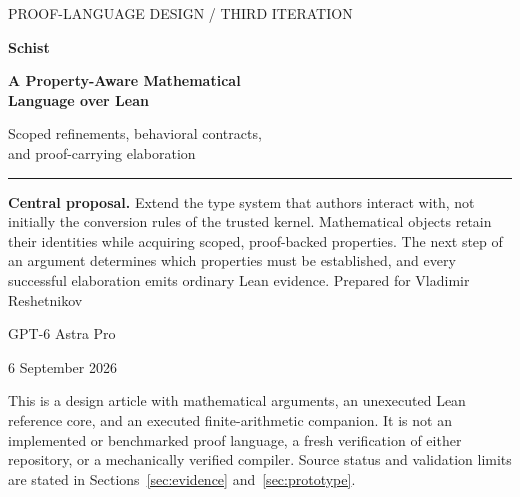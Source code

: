 \documentclass[11pt,a4paper]{article}
\theoremstyle{definition}
\begin{document}
\hypersetup{pageanchor=false}
\begin{titlepage}
{\sffamily\large\color{accent}PROOF-LANGUAGE DESIGN \quad / \quad THIRD ITERATION\par}
\vspace{24mm}
{\sffamily\bfseries\color{ink}\fontsize{38}{42}\selectfont Schist\par}
\vspace{5mm}
{\sffamily\bfseries\color{ink}\fontsize{25}{30}\selectfont A Property-Aware Mathematical\\Language over Lean\par}
\vspace{9mm}
{\sffamily\Large Scoped refinements, behavioral contracts,\\and proof-carrying elaboration\par}
\vspace{15mm}
\rule{\textwidth}{.7pt}
\vspace{4mm}
\textbf{Central proposal.} Extend the type system that authors interact with, not
initially the conversion rules of the trusted kernel. Mathematical objects retain
their identities while acquiring scoped, proof-backed properties. The next step
of an argument determines which properties must be established, and every
successful elaboration emits ordinary Lean evidence.
\vfill
Prepared for Vladimir Reshetnikov\par
GPT-6 Astra Pro\par
6 September 2026\par
\vspace{6mm}
{\small This is a design article with mathematical arguments, an unexecuted
Lean reference core, and an executed finite-arithmetic companion. It is not an
implemented or benchmarked proof language, a fresh verification of either
repository, or a mechanically verified compiler. Source status and validation
limits are stated in Sections~\ref{sec:evidence} and~\ref{sec:prototype}.}
\end{titlepage}
\hypersetup{pageanchor=true}
\end{document}
